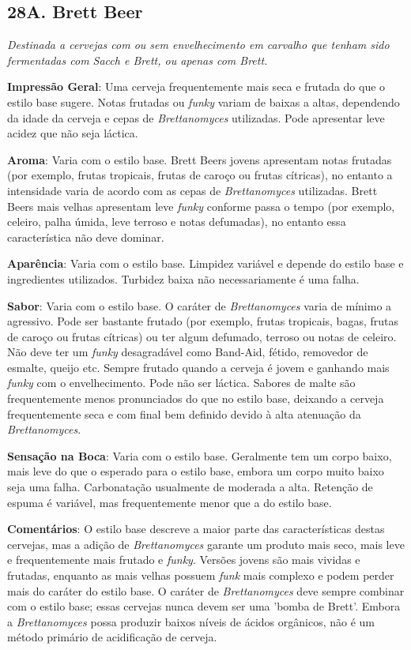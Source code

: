 \subsection*{28A. Brett Beer}
\textit{Destinada a cervejas com ou sem envelhecimento em carvalho que tenham sido fermentadas com Sacch e Brett, ou apenas com Brett.}

\textbf{Impressão Geral}: Uma cerveja frequentemente mais seca e frutada do que o estilo base sugere. Notas frutadas ou \textit{funky} variam de baixas a altas, dependendo da idade da cerveja e cepas de \textit{Brettanomyces} utilizadas. Pode apresentar leve acidez que não seja láctica.

\textbf{Aroma}: Varia com o estilo base. Brett Beers jovens apresentam notas frutadas (por exemplo, frutas tropicais, frutas de caroço ou frutas cítricas), no entanto a intensidade varia de acordo com as cepas de \textit{Brettanomyces} utilizadas. Brett Beers mais velhas apresentam leve \textit{funky} conforme passa o tempo (por exemplo, celeiro, palha úmida, leve terroso e notas defumadas), no entanto essa característica não deve dominar.

\textbf{Aparência}: Varia com o estilo base. Limpidez variável e depende do estilo base e ingredientes utilizados. Turbidez baixa não necessariamente é uma falha.

\textbf{Sabor}: Varia com o estilo base. O caráter de \textit{Brettanomyces} varia de mínimo a agressivo. Pode ser bastante frutado (por exemplo, frutas tropicais, bagas, frutas de caroço ou frutas cítricas) ou ter algum defumado, terroso ou notas de celeiro. Não deve ter um \textit{funky} desagradável como Band-Aid, fétido, removedor de esmalte, queijo etc. Sempre frutado quando a cerveja é jovem e ganhando mais \textit{funky} com o envelhecimento. Pode não ser láctica. Sabores de malte são frequentemente menos pronunciados do que no estilo base, deixando a cerveja frequentemente seca e com final bem definido devido à alta atenuação da \textit{Brettanomyces}.

\textbf{Sensação na Boca}: Varia com o estilo base. Geralmente tem um corpo baixo, mais leve do que o esperado para o estilo base, embora um corpo muito baixo seja uma falha. Carbonatação usualmente de moderada a alta. Retenção de espuma é variável, mas frequentemente menor que a do estilo base.

\textbf{Comentários}: O estilo base descreve a maior parte das características destas cervejas, mas a adição de \textit{Brettanomyces} garante um produto mais seco, mais leve e frequentemente mais frutado e \textit{funky}. Versões jovens são mais vividas e frutadas, enquanto as mais velhas possuem \textit{funk} mais complexo e podem perder mais do caráter do estilo base. O caráter de \textit{Brettanomyces} deve sempre combinar com o estilo base; essas cervejas nunca devem ser uma 'bomba de Brett'. Embora a \textit{Brettanomyces} possa produzir baixos níveis de ácidos orgânicos, não é um método primário de acidificação de cerveja.

